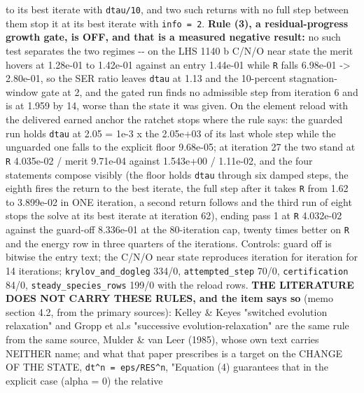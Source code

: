 \documentclass[english,a4paper]{my_memo}
\begin{document}
\begin{itemize}
  to its best iterate with \texttt{dtau/10}, and two such returns with no full step
  between them stop it at its best iterate with \texttt{info\ =\ 2}. \textbf{Rule (3), a
  residual-progress growth gate, is OFF, and that is a measured negative
  result:} no such test separates the two regimes -\/- on the LHS 1140 b C/N/O
  near state the merit hovers at 1.28e-01 to 1.42e-01 against an entry
  1.44e-01 while \texttt{\textbar{}\textbar{}R\textbar{}\textbar{}} falls 6.98e-01 -\textgreater{} 2.80e-01, so the SER ratio leaves
  \texttt{dtau} at 1.13 and the 10-percent stagnation-window gate at 2, and the gated
  run finds no admissible step from iteration 6 and is at 1.959 by 14, worse
  than the state it was given. On the element reload with the delivered earned
  anchor the ratchet stops where the rule says: the guarded run holds \texttt{dtau} at
  2.05 = 1e-3 x the 2.05e+03 of its last whole step while the unguarded one
  falls to the explicit floor 9.68e-05; at iteration 27 the two stand at
  \texttt{\textbar{}\textbar{}R\textbar{}\textbar{}} 4.035e-02 / merit 9.71e-04 against 1.543e+00 / 1.11e-02, and the four
  statements compose visibly (the floor holds \texttt{dtau} through six damped steps,
  the eighth fires the return to the best iterate, the full step after it takes
  \texttt{\textbar{}\textbar{}R\textbar{}\textbar{}} from 1.62 to 3.899e-02 in ONE iteration, a second return follows and
  the third run of eight stops the solve at its best iterate at iteration 62),
  ending pass 1 at \texttt{\textbar{}\textbar{}R\textbar{}\textbar{}} 4.032e-02 against the guard-off 8.336e-01 at the
  80-iteration cap, twenty times better on \texttt{\textbar{}\textbar{}R\textbar{}\textbar{}} and the energy row in three
  quarters of the iterations. Controls: guard off is bitwise the entry text;
  the C/N/O near state reproduces iteration for iteration for 14 iterations;
  \texttt{krylov\_and\_dogleg} 334/0, \texttt{attempted\_step} 70/0, \texttt{certification} 84/0,
  \texttt{steady\_species\_rows} 199/0 with the reload rows. \textbf{THE LITERATURE DOES NOT
  CARRY THESE RULES, and the item says so} (memo section 4.2, from the primary
  sources): Kelley \& Keyes\textquotesingle{} "switched evolution relaxation" and Gropp et al.\textquotesingle s
  "successive evolution-relaxation" are the same rule from the same source,
  Mulder \& van Leer (1985), whose own text carries NEITHER name; and what that
  paper prescribes is a target on the CHANGE OF THE STATE, \texttt{dt\^{}n\ =\ eps/RES\^{}n},
  "Equation (4) guarantees that in the explicit case (alpha = 0) the relative

\end{itemize}
\end{document}
